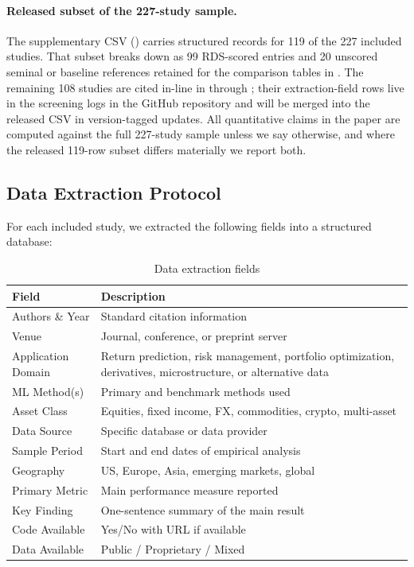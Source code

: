 \paragraph{Released subset of the 227-study sample.} The supplementary CSV
() carries structured records for 119 of the 227
included studies. That subset breaks down as 99 RDS-scored entries and 20
unscored seminal or baseline references retained for the comparison tables
in . The remaining 108 studies are cited in-line
in  through ; their
extraction-field rows live in the screening logs in the GitHub repository
and will be merged into the released CSV in version-tagged updates. All
quantitative claims in the paper are computed against the full 227-study
sample unless we say otherwise, and where the released 119-row subset
differs materially we report both.

\subsection{Data Extraction Protocol}

For each included study, we extracted the following fields into a structured database:

\begin{table}[H]
\centering
\caption{Data extraction fields}
\label{tab:extraction}
\begin{tabularx}{\textwidth}{lX}
\toprule
\textbf{Field} & \textbf{Description} \\
\midrule
Authors \& Year & Standard citation information \\
Venue & Journal, conference, or preprint server \\
Application Domain & Return prediction, risk management, portfolio optimization, derivatives, microstructure, or alternative data \\
ML Method(s) & Primary and benchmark methods used \\
Asset Class & Equities, fixed income, FX, commodities, crypto, multi-asset \\
Data Source & Specific database or data provider \\
Sample Period & Start and end dates of empirical analysis \\
Geography & US, Europe, Asia, emerging markets, global \\
Primary Metric & Main performance measure reported \\
Key Finding & One-sentence summary of the main result \\
Code Available & Yes/No with URL if available \\
Data Available & Public / Proprietary / Mixed \\
\bottomrule
\end{tabularx}
\end{table}

